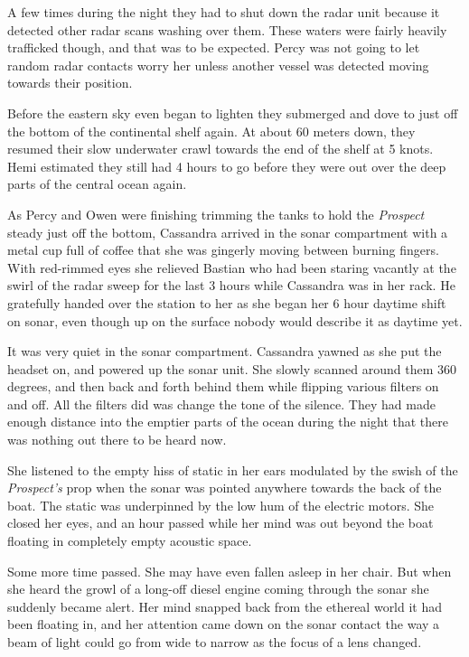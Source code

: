\documentclass[
]{scrbook}
\begin{document}
A few times during the night they had to shut down the radar unit
because it detected other radar scans washing over them. These waters
were fairly heavily trafficked though, and that was to be expected.
Percy was not going to let random radar contacts worry her unless
another vessel was detected moving towards their position.

Before the eastern sky even began to lighten they submerged and dove to
just off the bottom of the continental shelf again. At about 60 meters
down, they resumed their slow underwater crawl towards the end of the
shelf at 5 knots. Hemi estimated they still had 4 hours to go before
they were out over the deep parts of the central ocean again.

As Percy and Owen were finishing trimming the tanks to hold the
\emph{Prospect} steady just off the bottom, Cassandra arrived in the
sonar compartment with a metal cup full of coffee that she was gingerly
moving between burning fingers. With red-rimmed eyes she relieved
Bastian who had been staring vacantly at the swirl of the radar sweep
for the last 3 hours while Cassandra was in her rack. He gratefully
handed over the station to her as she began her 6 hour daytime shift on
sonar, even though up on the surface nobody would describe it as daytime
yet.

It was very quiet in the sonar compartment. Cassandra yawned as she put
the headset on, and powered up the sonar unit. She slowly scanned around
them 360 degrees, and then back and forth behind them while flipping
various filters on and off. All the filters did was change the tone of
the silence. They had made enough distance into the emptier parts of the
ocean during the night that there was nothing out there to be heard now.

She listened to the empty hiss of static in her ears modulated by the
swish of the \emph{Prospect's} prop when the sonar was pointed anywhere
towards the back of the boat. The static was underpinned by the low hum
of the electric motors. She closed her eyes, and an hour passed while
her mind was out beyond the boat floating in completely empty acoustic
space.

Some more time passed. She may have even fallen asleep in her chair. But
when she heard the growl of a long-off diesel engine coming through the
sonar she suddenly became alert. Her mind snapped back from the ethereal
world it had been floating in, and her attention came down on the sonar
contact the way a beam of light could go from wide to narrow as the
focus of a lens changed.
\end{document}
